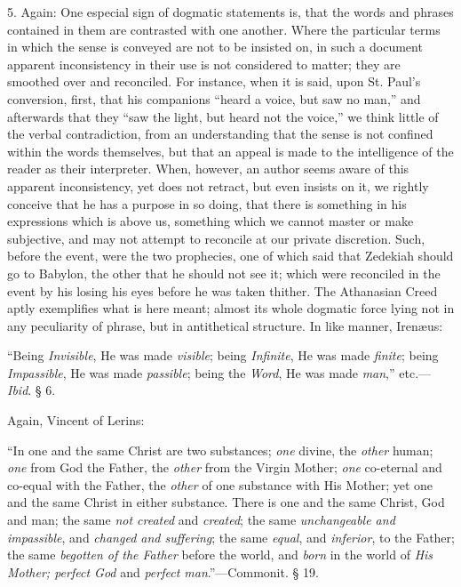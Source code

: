 5. Again: One especial sign of dogmatic
statements is, that the words and phrases contained in them are
contrasted with one another. Where the particular terms in which the
sense is conveyed are not to be insisted on, in such a document
apparent inconsistency in their use is not considered to matter; they
are smoothed over and reconciled. For instance, when it is said, upon
St. Paul's conversion, first, that his companions ``heard a voice, but
saw no man,'' and afterwards that they ``saw the light, but heard not
the voice,'' we think little of the verbal contradiction, from an
understanding that the sense is not confined within the words
themselves, but that an appeal is made to the intelligence of the
reader as their interpreter. When, however, an author seems aware of
this apparent inconsistency, yet does not retract, but even insists on
it, we rightly conceive that he has a purpose in so doing, that
there is something in his expressions which is above us, something
which we cannot master or make subjective, and may not attempt to
reconcile at our private discretion. Such, before the event, were the
two prophecies, one of which said that Zedekiah should go to Babylon,
the other that he should not see it; which were reconciled in the
event by his losing his eyes before he was taken thither. The
Athanasian Creed aptly exemplifies what is here meant; almost its
whole dogmatic force lying not in any peculiarity of phrase, but in
antithetical structure. In like manner, Irenæus:

``Being
\emph{Invisible}, He was made \emph{visible}; being \emph{Infinite},
He was made \emph{finite}; being \emph{Impassible}, He was made \emph{passible};
being the \emph{Word}, He was made \emph{man},'' etc.—\emph{Ibid}. §
6.

Again, Vincent of Lerins:

``In
one and the same Christ are two substances; \emph{one} divine, the \emph{other}
human; \emph{one} from God the Father, the \emph{other} from the
Virgin Mother; \emph{one} co-eternal and co-equal with the Father, the
\emph{other} of one substance with His Mother; yet one and the same
Christ in either substance. There is one and the same Christ, God and
man; the same \emph{not created} and \emph{created}; the same \emph{unchangeable
and impassible}, and \emph{changed and suffering}; the same \emph{equal},
and \emph{inferior}, to the Father; the same \emph{begotten of the Father}
before the world, and \emph{born} in the world of \emph{His Mother;
perfect God} and \emph{perfect man}.''—Commonit. § 19.


